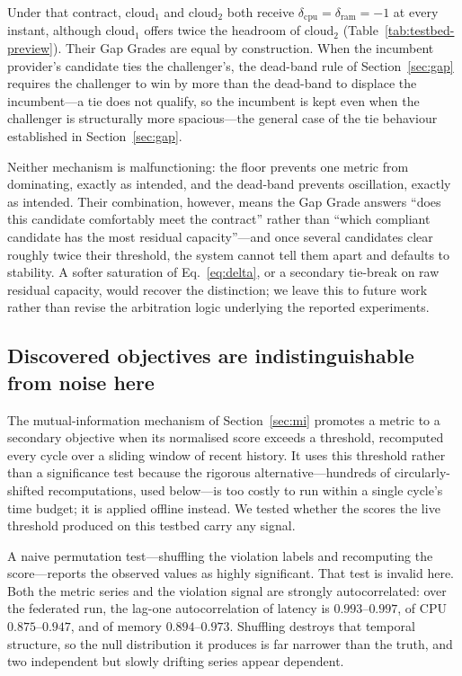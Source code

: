 \documentclass[conference]{IEEEtran}
\begin{document}
Under that contract, cloud$_1$ and cloud$_2$ both receive
$\delta_{\text{cpu}} = \delta_{\text{ram}} = -1$ at every instant, although
cloud$_1$ offers twice the headroom of cloud$_2$
(Table~\ref{tab:testbed-preview}). Their Gap Grades are equal by
construction. When the incumbent provider's candidate ties the challenger's,
the dead-band rule of Section~\ref{sec:gap} requires the challenger to win by
more than the dead-band to displace the incumbent---a tie does not qualify,
so the incumbent is kept even when the challenger is structurally more
spacious---the general case of the tie behaviour established in
Section~\ref{sec:gap}.

Neither mechanism is malfunctioning: the floor prevents one metric from
dominating, exactly as intended, and the dead-band prevents oscillation,
exactly as intended. Their combination, however, means the Gap Grade answers
``does this candidate comfortably meet the contract'' rather than ``which
compliant candidate has the most residual capacity''---and once several
candidates clear roughly twice their threshold, the system cannot tell them
apart and defaults to stability. A softer saturation of
Eq.~\eqref{eq:delta}, or a secondary tie-break on raw residual capacity,
would recover the distinction; we leave this to future work rather than
revise the arbitration logic underlying the reported experiments.

\subsection{Discovered objectives are indistinguishable from noise here}
\label{sec:limit-mi}

The mutual-information mechanism of Section~\ref{sec:mi} promotes a metric to
a secondary objective when its normalised score exceeds a threshold, recomputed
every cycle over a sliding window of recent history. It uses this threshold
rather than a significance test because the rigorous alternative---hundreds
of circularly-shifted recomputations, used below---is too costly to run
within a single cycle's time budget; it is applied offline instead. We tested
whether the scores the live threshold produced on this testbed carry any
signal.

A naive permutation test---shuffling the violation labels and recomputing the
score---reports the observed values as highly significant. That test is
invalid here. Both the metric series and the violation signal are strongly
autocorrelated: over the federated run, the lag-one autocorrelation of
latency is $0.993$--$0.997$, of CPU $0.875$--$0.947$, and of memory
$0.894$--$0.973$. Shuffling destroys that temporal structure, so the null
distribution it produces is far narrower than the truth, and two independent
but slowly drifting series appear dependent.
\end{document}
